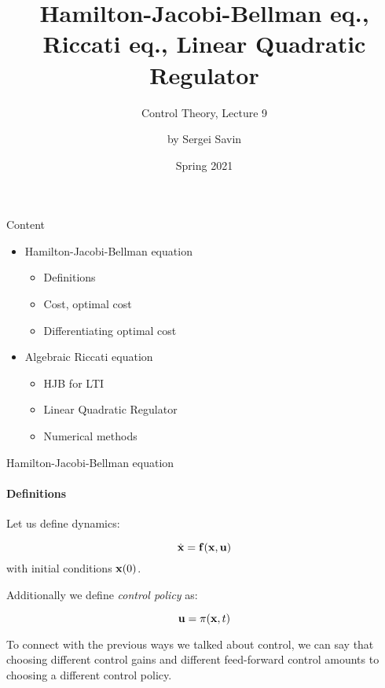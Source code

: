 \documentclass{beamer}
\title{Hamilton-Jacobi-Bellman eq., Riccati eq., Linear Quadratic Regulator}
\subtitle{Control Theory, Lecture 9}
\author{by Sergei Savin}
\date{Spring 2021}
\begin{document}
\maketitle


\begin{frame}{Content}
\begin{itemize}
\item Hamilton-Jacobi-Bellman equation
\begin{itemize}
    \item Definitions
    \item Cost, optimal cost
    \item Differentiating optimal cost
\end{itemize}
\item Algebraic Riccati equation
\begin{itemize}
    \item HJB for LTI
    \item Linear Quadratic Regulator
    \item Numerical methods
\end{itemize}
\end{itemize}
\end{frame}

\begin{frame}{Hamilton-Jacobi-Bellman equation}
\framesubtitle{Definitions}
\begin{flushleft}

Let us define dynamics:

\begin{equation}
    \dot {\mathbf{x}} = \mathbf{f} (\mathbf{x}, \mathbf{u})
\end{equation}
%
with initial conditions $\mathbf{x}(0)$. 

\bigskip

Additionally we define \emph{control policy} as:

\begin{equation}
    \mathbf{u} = \pi (\mathbf{x}, t)
\end{equation}

To connect with the previous ways we talked about control, we can say that choosing different control gains and different feed-forward control amounts to choosing a different control policy.

\end{flushleft}
\end{frame}
\end{document}
